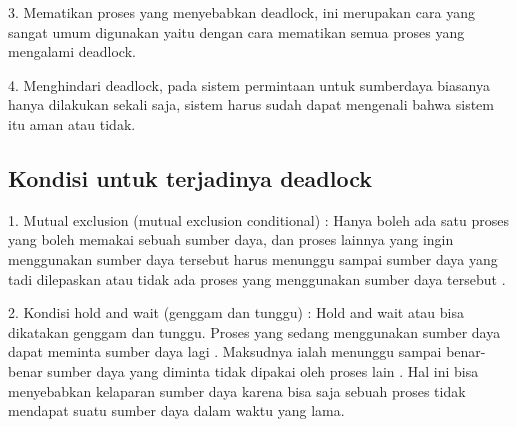 	3. Mematikan proses yang menyebabkan deadlock, ini merupakan cara yang sangat umum digunakan yaitu dengan cara mematikan semua proses yang mengalami deadlock.
	
	4. Menghindari deadlock, pada sistem permintaan untuk sumberdaya biasanya hanya dilakukan sekali saja, sistem harus sudah dapat mengenali bahwa sistem itu aman atau tidak.
	
\subsection {Kondisi untuk terjadinya deadlock}
	1. Mutual exclusion (mutual exclusion conditional) : Hanya boleh ada satu proses yang boleh memakai sebuah sumber daya, dan proses lainnya yang ingin menggunakan sumber daya tersebut harus menunggu sampai sumber daya yang tadi dilepaskan atau tidak ada proses yang menggunakan sumber daya tersebut .
	
	2. Kondisi hold and wait (genggam dan tunggu) : Hold and wait atau bisa dikatakan genggam dan tunggu. Proses yang sedang menggunakan sumber daya dapat meminta sumber daya lagi . Maksudnya ialah menunggu sampai benar-benar sumber daya yang diminta tidak dipakai oleh proses lain . Hal ini bisa menyebabkan kelaparan sumber daya karena bisa saja sebuah proses tidak mendapat suatu sumber daya dalam waktu yang lama.